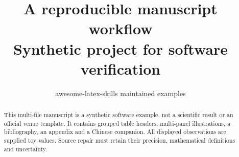 \documentclass[twocolumn]{article}
\title{A reproducible manuscript workflow\\\large Synthetic project for software verification}
\author{awesome-latex-skills maintained examples}
\date{}
\begin{document}
\maketitle
\begin{abstract}
This multi-file manuscript is a synthetic software example, not a scientific
result or an official venue template. It contains grouped table headers,
multi-panel illustrations, a bibliography, an appendix and a Chinese companion.
All displayed observations are supplied toy values. Source repair must retain
their precision, mathematical definitions and uncertainty.
\end{abstract}






\appendix

\end{document}
